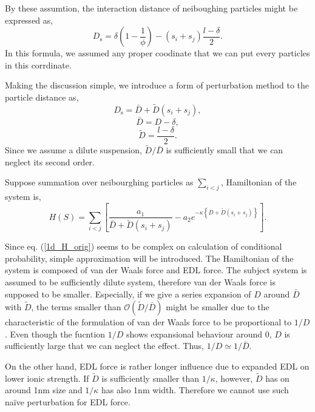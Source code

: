 \documentclass{article}
\begin{document}
By these assumtion, the interaction distance of neiboughing particles might be expressed as,
\begin{equation}
 D_\text{s} = \delta\left(1 - \frac{1}{\phi}\right) - (s_i + s_j)\frac{l-\delta}{2}.  \label{distance}
\end{equation}
In this formula, we assumed any proper coodinate that we can put every particles in this corrdinate.

Making the discussion simple, we introduce a form of perturbation method to the particle distance as,
\begin{equation}
 D_{\text{s}} = \bar{D} + \tilde{D} (s_i + s_j),
\end{equation}
\begin{equation}
 \bar{D} = D - \delta,
\end{equation}
\begin{equation}
 \tilde{D} = \frac{l - \delta}{2}.
\end{equation}
Since we assume a dilute suspension, $\tilde{D} / \bar{D}$ is sufficiently small that we can neglect its second order.

Suppose summation over neibourghing particles as $\sum_{i<j}$, Hamiltonian of the system is,
\begin{equation}
 H(S) = \sum_{i<j} \left[\frac{a_1}{\bar{D} + \tilde{D}(s_i + s_j)}  - 
		    a_2 e^{-\kappa \left\{\bar{D} + \tilde{D} (s_i + s_j)\right\}}\right].  \label{1d_H_orig}
\end{equation}

Since eq. (\ref{1d_H_orig}) seems to be complex on calculation of conditional probability, simple approximation will be introduced.
The Hamiltonian of the system is composed of van der Waals force and EDL force.
The subject system is assumed to be sufficiently dilute system, therefore van der Waals force is supposed to be smaller.
Especially, if we give a series expansion of $D$ around $\bar{D}$ with $\tilde{D}$, the terms smaller than $\mathcal{O} (\tilde{D}/\bar{D})$
might be smaller due to the characteristic of the formulation of van der Waals force to be proportional to $1/D$.
Even though the fucntion $1/D$ shows expansional behaviour around 0, $D$ is sufficiently large that we can neglect the effect.
Thus, $1/D \simeq 1/\bar{D}$.

On the other hand, EDL force is rather longer influence due to expanded EDL on lower ionic strength.
If $\tilde{D}$ is sufficiently smaller than $1/\kappa$, however, $\tilde{D}$ has on around 1nm size and $1/\kappa$ has also 1nm width.
Therefore we cannot use such na\"{i}ve perturbation for EDL force.
\end{document}
